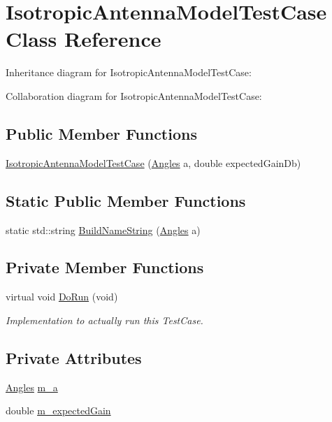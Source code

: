 \hypertarget{classIsotropicAntennaModelTestCase}{}\section{Isotropic\+Antenna\+Model\+Test\+Case Class Reference}
\label{classIsotropicAntennaModelTestCase}


Inheritance diagram for Isotropic\+Antenna\+Model\+Test\+Case\+:


Collaboration diagram for Isotropic\+Antenna\+Model\+Test\+Case\+:
\subsection*{Public Member Functions}
\begin{DoxyCompactItemize}
\item 
\hyperlink{classIsotropicAntennaModelTestCase_a12eec7b62ecfecf5e6c3af196c070f2b}{Isotropic\+Antenna\+Model\+Test\+Case} (\hyperlink{structns3_1_1Angles}{Angles} a, double expected\+Gain\+Db)
\end{DoxyCompactItemize}
\subsection*{Static Public Member Functions}
\begin{DoxyCompactItemize}
\item 
static std\+::string \hyperlink{classIsotropicAntennaModelTestCase_a53d9c36cf727d2e33e4205f25bd3f718}{Build\+Name\+String} (\hyperlink{structns3_1_1Angles}{Angles} a)
\end{DoxyCompactItemize}
\subsection*{Private Member Functions}
\begin{DoxyCompactItemize}
\item 
virtual void \hyperlink{classIsotropicAntennaModelTestCase_a5edff924be361122e9e6debaf49f3783}{Do\+Run} (void)
\begin{DoxyCompactList}\small\item\em Implementation to actually run this Test\+Case. \end{DoxyCompactList}\end{DoxyCompactItemize}
\subsection*{Private Attributes}
\begin{DoxyCompactItemize}
\item 
\hyperlink{structns3_1_1Angles}{Angles} \hyperlink{classIsotropicAntennaModelTestCase_aa39e72e7dabac56e7a680f80a3149c18}{m\+\_\+a}
\item 
double \hyperlink{classIsotropicAntennaModelTestCase_a285c0b7b25b1d1ed94298d46e4a3376b}{m\+\_\+expected\+Gain}
\end{DoxyCompactItemize}
